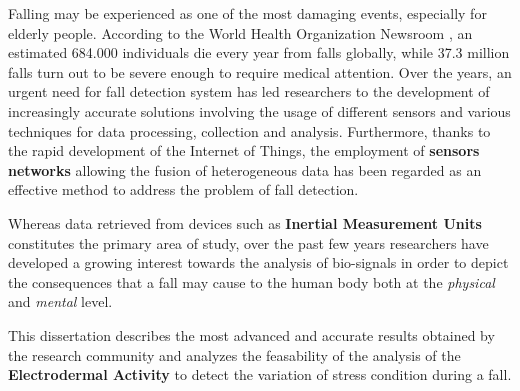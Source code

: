 \label{section:introduction}

Falling may be experienced as one of the most damaging events, especially for elderly people. According to the World Health Organization Newsroom \cite{WhoData}, an estimated 684.000 individuals die every year from falls globally, while 37.3 million falls turn out to be severe enough to require medical attention. 
Over the years, an urgent need for fall detection system has led researchers to the development of increasingly accurate solutions involving the usage of different sensors and various techniques for data processing, collection and analysis.
Furthermore, thanks to the rapid development of the Internet of Things, the employment of \textbf{sensors networks} allowing the fusion of heterogeneous data has been regarded as an effective method to address the problem of fall detection.

Whereas data retrieved from devices such as \textbf{Inertial Measurement Units} constitutes the primary area of study, over the past few years researchers have developed a growing interest towards the analysis of bio-signals in order to depict the consequences that a fall may cause to the human body both at the \textit{physical} and \textit{mental} level.

This dissertation describes the most advanced and accurate results obtained by the research community and analyzes the feasability of the analysis of the \textbf{Electrodermal Activity} to detect the variation of stress condition during a fall. 

